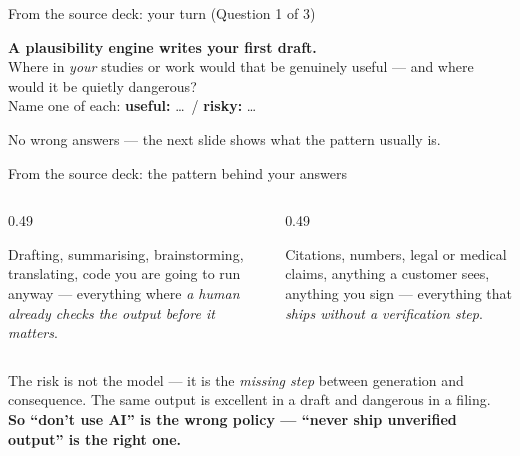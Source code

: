 \begin{frame}{From the source deck: your turn (Question 1 of 3)}
  \vspace{4mm}
  \begin{exercise}
    \large\textbf{A plausibility engine writes your first draft.}\\[2mm]
    \normalsize Where in \emph{your} studies or work would that be genuinely useful ---
    and where would it be quietly dangerous?\\[2mm]
    Name one of each: \textbf{useful:} \dots\ / \textbf{risky:} \dots
  \end{exercise}
  \vspace{3mm}\centering
  {\footnotesize\color{black!60}No wrong answers --- the next slide shows what the pattern usually is.}
\end{frame}

\begin{frame}{From the source deck: the pattern behind your answers}
  \begin{columns}[T,onlytextwidth]
    \begin{column}{0.49\textwidth}
      \begin{solutionbox}
        \footnotesize Drafting, summarising, brainstorming, translating, code you are going to run anyway ---
        everything where \emph{a human already checks the output before it matters}.
      \end{solutionbox}
    \end{column}
    \begin{column}{0.49\textwidth}
      \begin{mistake}
        Citations, numbers, legal or medical claims, anything a customer sees, anything you sign ---
        everything that \emph{ships without a verification step}.
      \end{mistake}
    \end{column}
  \end{columns}
  \vspace{1mm}
  \begin{readme}
    \footnotesize The risk is not the model --- it is the \emph{missing step} between generation and consequence.
    The same output is excellent in a draft and dangerous in a filing.
    \textbf{So ``don't use AI'' is the wrong policy --- ``never ship unverified output'' is the right one.}
  \end{readme}
\end{frame}

